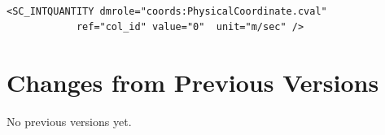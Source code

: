 \documentclass[11pt,a4paper]{ivoa}
\begin{document}
\begin{lstlisting}[caption={\texttt{ivoa:IntegerQuantity} example},style=XML,basicstyle=\small]

<SC_INTQUANTITY dmrole="coords:PhysicalCoordinate.cval"
            ref="col_id" value="0"  unit="m/sec" />
\end{lstlisting}

\clearpage
\appendix

\section{Changes from Previous Versions}

No previous versions yet.  



\end{document}
